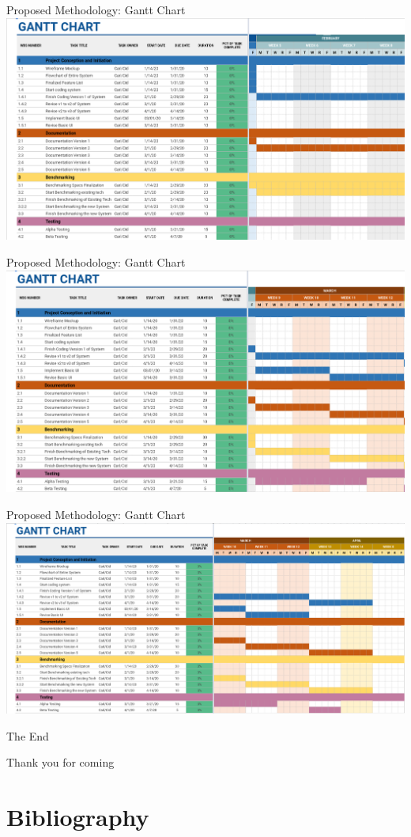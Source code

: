 \documentclass{beamer}
\begin{document}
    \begin{frame}{Proposed Methodology: Gantt Chart}
        \centering
        \includegraphics[scale=1]{feb.png}
    \end{frame}
    
    \begin{frame}{Proposed Methodology: Gantt Chart}
        \centering
        \includegraphics[scale=1]{mar.png}
    \end{frame}
    
    \begin{frame}{Proposed Methodology: Gantt Chart}
        \centering
        \includegraphics[scale=1]{april.png}
    \end{frame}



\begin{frame}
\Huge{\centerline{The End}}
\small{\centerline{Thank you for coming}}
\end{frame}

\section{Bibliography}

\begin{frame}[allowframebreaks]
\printbibliography[heading=none]
\end{frame}
\end{document}
